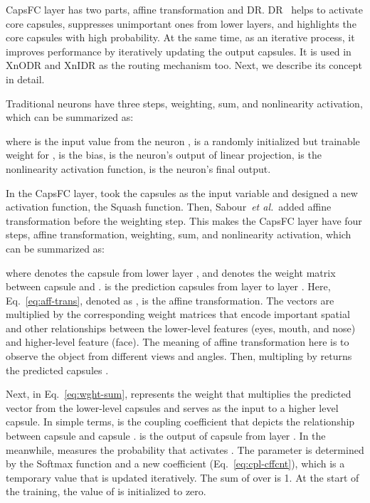 \documentclass[sn-mathphys,iicol,Numbered]{sn-jnl}
\newcommand{\etal}{\textit{et al.}}
\begin{document}
CapsFC layer has two parts, affine transformation and DR. DR~\citep{A1_caps} helps to activate core capsules, suppresses unimportant ones from lower layers, and highlights the core capsules with high probability. At the same time, as an iterative process, it improves performance by iteratively updating the output capsules. It is used in XnODR and XnIDR as the routing mechanism too. Next, we describe its concept in detail.

Traditional neurons have three steps, weighting, sum, and nonlinearity activation, which can be summarized as:


where  is the input value from the neuron ,  is a randomly initialized but trainable weight  for ,  is the bias,  is the  neuron's output of linear projection,  is the nonlinearity activation function,  is the  neuron's final output.

In the CapsFC layer, \cite{A1_caps} took the capsules as the input variable and designed a new activation function, the Squash function. Then, Sabour~\etal~added affine transformation before the weighting step. This makes the CapsFC layer have four steps, affine transformation, weighting, sum, and nonlinearity activation, which can be summarized as:

\vspace{-0.5cm}

where  denotes the capsule  from lower layer , and  denotes the weight matrix between capsule  and .  is the prediction capsules from layer  to layer . Here, Eq.~\ref{eq:aff-trans}, denoted as , is the affine transformation. The vectors  are multiplied by the corresponding weight matrices  that encode important spatial and other relationships between the lower-level features (eyes, mouth, and nose) and higher-level feature (face). The meaning of affine transformation here is to observe the object from different views and angles. Then, multipling  by  returns the predicted capsules .

Next, in Eq.~\ref{eq:wght-sum},  represents the weight that multiplies the predicted vector  from the lower-level capsules and serves as the input to a higher level capsule. In simple terms,  is the coupling coefficient that depicts the relationship between capsule  and capsule .  is the output of capsule  from layer . In the meanwhile,  measures the probability that  activates . The parameter  is determined by the Softmax function and a new coefficient  (Eq.~\ref{eq:cpl-cffcnt}), which is a temporary value that is updated iteratively. The sum of  over  is 1. At the start of the training, the value of  is initialized to zero.
\end{document}
